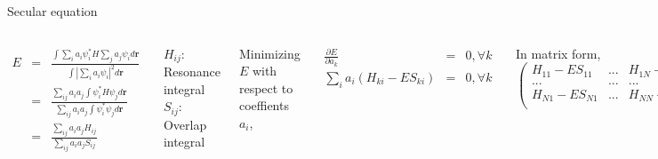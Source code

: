 \documentclass[aspectratio=169]{beamer}
\let \vec \mathbf
\begin{document}
\begin{frame}{Secular equation}

\begin{columns}
\begin{eqnarray*}
    E & = &\frac{\int \sum_i a_i \psi_i^* H \sum_j a_j \psi_i d\vec{r}}{\int |\sum_i a_i \psi_i|^2 d\vec{r}}\\
    & = &\frac{\sum_{ij} a_i a_j \int \psi_i^* H \psi_j d\vec{r}}{\sum_{ij} a_i a_j \int \psi_i^* \psi_j d\vec{r}}\\
    & = &\frac{\sum_{ij} a_i a_j H_{ij}}{\sum_{ij} a_i a_j S_{ij} }\\
\end{eqnarray*}

$H_{ij}$: Resonance integral\\
$S_{ij}$: Overlap integral


Minimizing $E$ with respect to coeffients $a_i$,

\begin{eqnarray*}
    \frac{\partial E}{\partial a_k} & = & 0, \forall k \\
    \sum_i a_i (H_{ki} - E S_{ki}) & = & 0, \forall k
\end{eqnarray*}

In matrix form,
\begin{equation*}
\begin{pmatrix}
H_{11}-ES_{11} & ... & H_{1N}-ES_{1N}\\
... & ... & ...\\
H_{N1}-ES_{N1} & ... & H_{NN}-ES_{NN}\\
\end{pmatrix}
\begin{pmatrix}
a_1\\
...\\
a_N\\
\end{pmatrix}
= 0
\end{equation*}
\end{columns}
\end{frame}
\end{document}

